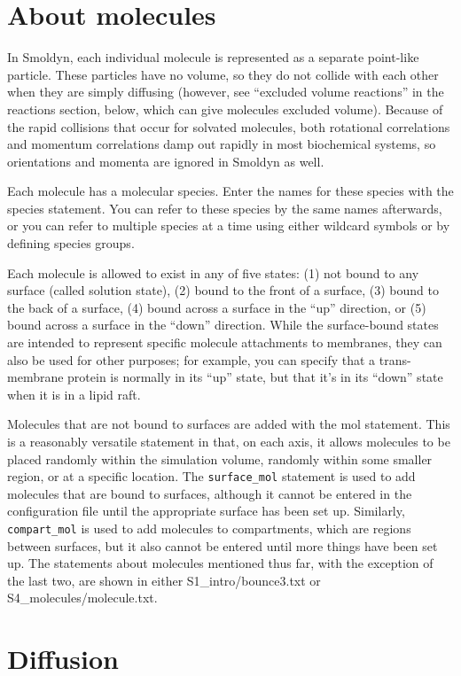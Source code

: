 \documentclass {scrbook}
\newcommand {\ttt} {\texttt}
\begin{document}
\section{About molecules}

In Smoldyn, each individual molecule is represented as a separate point-like particle. These particles have no volume, so they do not collide with each other when they are simply diffusing (however, see ``excluded volume reactions'' in the reactions section, below, which can give molecules excluded volume). Because of the rapid collisions that occur for solvated molecules, both rotational correlations and momentum correlations damp out rapidly in most biochemical systems, so orientations and momenta are ignored in Smoldyn as well.

Each molecule has a molecular species. Enter the names for these species with the species statement. You can refer to these species by the same names afterwards, or you can refer to multiple species at a time using either wildcard symbols or by defining species groups.

Each molecule is allowed to exist in any of five states: (1) not bound to any surface (called solution state), (2) bound to the front of a surface, (3) bound to the back of a surface, (4) bound across a surface in the ``up'' direction, or (5) bound across a surface in the ``down'' direction. While the surface-bound states are intended to represent specific molecule attachments to membranes, they can also be used for other purposes; for example, you can specify that a trans-membrane protein is normally in its ``up'' state, but that it's in its ``down'' state when it is in a lipid raft.

Molecules that are not bound to surfaces are added with the mol statement. This is a reasonably versatile statement in that, on each axis, it allows molecules to be placed randomly within the simulation volume, randomly within some smaller region, or at a specific location. The \ttt{surface\_mol} statement is used to add molecules that are bound to surfaces, although it cannot be entered in the configuration file until the appropriate surface has been set up. Similarly, \ttt{compart\_mol} is used to add molecules to compartments, which are regions between surfaces, but it also cannot be entered until more things have been set up. The statements about molecules mentioned thus far, with the exception of the last two, are shown in either S1\_intro/bounce3.txt or S4\_molecules/molecule.txt.

\section{Diffusion}
\end{document}
